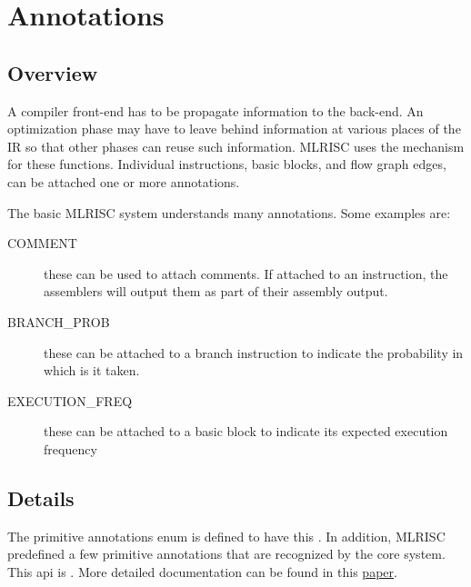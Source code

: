 \section{Annotations}

\subsection{Overview}
A compiler front-end has to be propagate information to
the back-end.  An optimization phase may have to leave behind information
at various places of the IR so that other phases can reuse such information.
MLRISC uses the 
mechanism for these functions.  
Individual instructions, basic blocks, and flow graph edges, 
can be attached one or more annotations.  

The basic MLRISC system understands many annotations.  Some examples are:
\begin{description}
   \item[COMMENT] 
         these can be used to attach comments.  If attached to
         an instruction, the assemblers will output 
         them as part of their assembly output.
   \item[BRANCH\_PROB]
          these can be attached to a branch instruction to indicate
          the probability in which is it taken.
   \item[EXECUTION\_FREQ]
          these can be attached to a basic block to indicate 
          its expected execution frequency 
\end{description}

\subsection{Details}
The primitive annotations enum is defined
to have this .
In addition, MLRISC predefined a few primitive annotations that are
recognized by the core system.  This api is
.
More detailed documentation can be found in this 
\href{http://cm.bell-labs.com/cm/cs/what/smlnj/compiler-notes/annotations.ps}{paper}.
